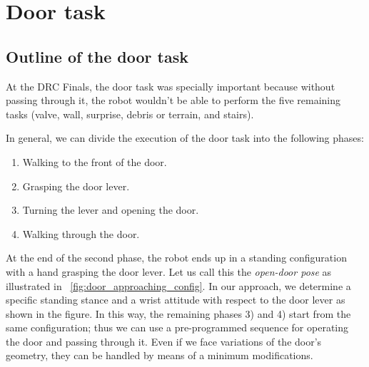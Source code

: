 \section{Door task}
	\label{sub:door}

\subsection{Outline of the door task}
%
At the DRC Finals, the door task was specially important because without passing through it,
the robot wouldn't be able to perform the five remaining tasks
(valve, wall, surprise, debris or terrain, and stairs).
   
In general, we can divide the execution of the door task into the following phases:
%
\begin{enumerate}
	\item Walking to the front of the door.
	\item Grasping the door lever.
	\item Turning the lever and opening the door.
	\item Walking through the door.
\end{enumerate}
%

%

At the end of the second phase, the robot ends up in a standing configuration with a hand grasping
the door lever.
Let us call this the {\it open-door pose} as illustrated in \figurename~\ref{fig:door_approaching_config}.
In our approach, we determine a specific standing stance and a wrist attitude with respect to 
the door lever as shown in the figure.
In this way, the remaining phases 3) and 4) start from the same configuration;
thus we can use a pre-programmed sequence for operating the door and passing through it.
Even if we face variations of the door's geometry,
they can be handled by means of a minimum modifications.

